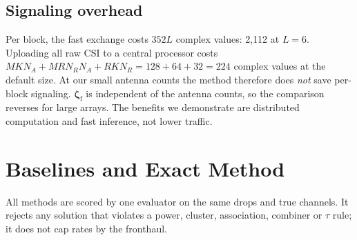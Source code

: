 \documentclass[conference]{IEEEtran}
\newcommand{\zf}{\boldsymbol{\zeta}_{\mathrm{f}}}
\begin{document}
\subsection{Signaling overhead}
Per block, the fast exchange costs $352L$ complex values: 2{,}112 at $L=6$.
Uploading all raw CSI to a central processor costs
$MKN_A + MRN_RN_A + RKN_R = 128 + 64 + 32 = 224$ complex values at the
default size. At our small antenna counts the method therefore does
\emph{not} save per-block signaling. $\zf$ is independent of the antenna
counts, so the comparison reverses for large arrays. The benefits we
demonstrate are distributed computation and fast inference, not lower
traffic.

\section{Baselines and Exact Method}\label{sec:baselines}
All methods are scored by one evaluator on the same drops and true channels.
It rejects any solution that violates a power, cluster, association,
combiner or $\tau$ rule; it does not cap rates by the fronthaul.
\end{document}

